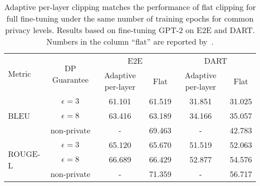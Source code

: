





\setlength{\tabcolsep}{2.5pt}
\renewcommand{\arraystretch}{0.75}
\begin{table}[thb]
\footnotesize
\caption{
Adaptive per-layer clipping matches the performance of flat clipping for full fine-tuning under the same number of training epochs for common privacy levels.
Results based on fine-tuning GPT-2 on E2E and DART.
Numbers in the column ``flat'' are reported by~\cite{li2022large}.
}
\centering
\begin{tabular}{l c cc cc}
\toprule
\multirow{2}[0]{*}{Metric} & \multirow{2}[0]{*}{DP Guarantee} & \multicolumn{2}{c}{E2E} & \multicolumn{2}{c}{DART} \\
\cmidrule(lr){3-4} \cmidrule(lr){5-6}
 & & {Adaptive per-layer} & {Flat} & {Adaptive per-layer} & {Flat} \\

\midrule
\multirow{3}[1]{*}{BLEU}

 & $\epsilon=3$ & 61.101 & 61.519     & 31.851 & 31.025  \\
 & $\epsilon=8$ & 63.416 & 63.189     & 34.166 & 35.057  \\
 & non-private    & -  & 69.463         & -  & 42.783  \\

\midrule
\multirow{3}[1]{*}{ROUGE-L}

 & $\epsilon=3$ & 65.120 & 65.670   & 51.519 & 52.063 \\
 & $\epsilon=8$ & 66.689 & 66.429   & 52.877 & 54.576 \\
 & non-private    & -  & 71.359         & -  & 56.717   \\

\bottomrule
\end{tabular}
\label{table:table2text_trimmed}
\end{table}

